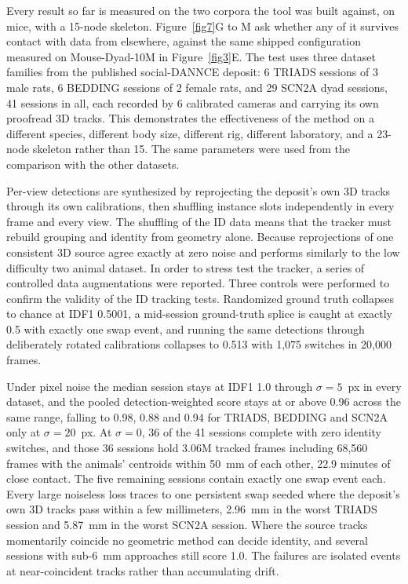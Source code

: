 \documentclass[pdflatex, sn-nature]{sn-jnl}
\theoremstyle{thmstyleone}%
\theoremstyle{thmstyletwo}%
\theoremstyle{thmstylethree}%
\begin{document}
Every result so far is measured on the two corpora the tool was built against, on mice, with a 15-node skeleton. Figure~\ref{fig7}G to M ask whether any of it survives contact with data from elsewhere, against the same shipped configuration measured on Mouse-Dyad-10M in Figure~\ref{fig3}E. The test uses three dataset families from the published social-DANNCE deposit: 6 TRIADS sessions of 3 male rats, 6 BEDDING sessions of 2 female rats, and 29 SCN2A dyad sessions, 41 sessions in all, each recorded by 6 calibrated cameras and carrying its own proofread 3D tracks. This demonstrates the effectiveness of the method on a different species, different body size, different rig, different laboratory, and a 23-node skeleton rather than 15. The same parameters were used from the comparison with the other datasets.

Per-view detections are synthesized by reprojecting the deposit's own 3D tracks through its own calibrations, then shuffling instance slots independently in every frame and every view. The shuffling of the ID data means that the tracker must rebuild grouping and identity from geometry alone. Because reprojections of one consistent 3D source agree exactly at zero noise and performs similarly to the low difficulty two animal dataset. In order to stress test the tracker, a series of controlled data augmentations were reported. Three controls were performed to confirm the validity of the ID tracking tests. Randomized ground truth collapses to chance at IDF1 0.5001, a mid-session ground-truth splice is caught at exactly 0.5 with exactly one swap event, and running the same detections through deliberately rotated calibrations collapses to 0.513 with 1,075 switches in 20,000 frames.

Under pixel noise the median session stays at IDF1 1.0 through $\sigma = 5$~px in every dataset, and the pooled detection-weighted score stays at or above 0.96 across the same range, falling to 0.98, 0.88 and 0.94 for TRIADS, BEDDING and SCN2A only at $\sigma = 20$~px. At $\sigma = 0$, 36 of the 41 sessions complete with zero identity switches, and those 36 sessions hold 3.06M tracked frames including 68,560 frames with the animals' centroids within 50~mm of each other, 22.9 minutes of close contact. The five remaining sessions contain exactly one swap event each. Every large noiseless loss traces to one persistent swap seeded where the deposit's own 3D tracks pass within a few millimeters, 2.96~mm in the worst TRIADS session and 5.87~mm in the worst SCN2A session. Where the source tracks momentarily coincide no geometric method can decide identity, and several sessions with sub-6~mm approaches still score 1.0. The failures are isolated events at near-coincident tracks rather than accumulating drift.
\end{document}
